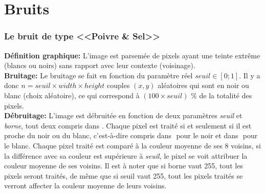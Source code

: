 \documentclass{article}
\begin{document}
	
	
	
	\newpage
	
	
	
	
	
	\part*{Bruits}
	
	
	
	
		\section{Le bruit de type <<Poivre \& Sel>>}
		\textbf{Définition graphique: }L'image est parsemée de pixels ayant une teinte extrême (blancs ou noirs) sans rapport avec leur contexte (voisinage).\\
		\textbf{Bruitage: }Le bruitage se fait en fonction du paramètre réel \begin{math}seuil\in[0;1]\end{math}. Il y a donc \begin{math}n = seuil\times width\times height\end{math} couples \begin{math}(x, y)\end{math} aléatoires qui sont en noir ou blanc (choix aléatoire), ce qui correspond à \begin{math}(100\times seuil)\end{math} \% de la totalité des pixels.\\
		\textbf{Débruitage: }L'image est débruitée en fonction de deux paramètres \emph{seuil} et \emph{borne}, tout deux compris dans \begin{math}[0;255]\end{math}. Chaque pixel est traité si et seulement si il est proche du noir ou du blanc, c'est-à-dire compris dans \begin{math}[0;borne]\end{math} pour le noir et dans \begin{math}[255-borne;255]\end{math} pour le blanc. Chaque pixel traité est comparé à la couleur moyenne de ses 8 voisins, si la différence avec sa couleur est supérieure à \emph{seuil}, le pixel se voit attribuer la couleur moyenne de ses voisins. Il est à noter que si borne vaut 255, tout les pixels seront traités, de même que si seuil vaut 255, tout les pixels traités se verront affecter la couleur moyenne de leurs voisins.\\\\
\end{document}
